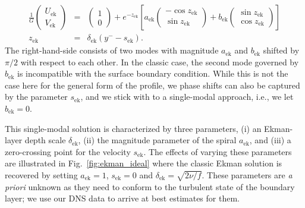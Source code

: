 \documentclass[a4paper,11pt]{amsart}
\begin{document}
\begin{subequations}
  \label{eqn:profile_ekman}
  \begin{eqnarray}
    \frac{1}{G}\left(\begin{array}{c} 
      U_\mathrm{ek}\\ 
      V_\mathrm{ek}
    \end{array}\right)  &=& \left(\begin{array}{c} 1 \\ 0 \end{array}\right) 
    + e^{-z_\mathrm{ek}} \left[ a_\mathrm{ek}  \left(\begin{array}{r}
      -\cos z_\mathrm{ek} \\ 
      \sin z_\mathrm{ek}
      \end{array}\right)  + b_\mathrm{ek}\left(\begin{array}{r}
        \sin z_\mathrm{ek} \\ \cos z_\mathrm{ek}
        \end{array}\right)\right]\\
    z_\mathrm{ek} &=& \delta_\mathrm{ek} (y^- -s_\mathrm{ek}). 
  \end{eqnarray}
\end{subequations}
%
The right-hand-side consists of two modes with magnitude $a_\mathrm{ek}$ and $b_\mathrm{ek}$
shifted by $\pi/2$ with respect to each other. 
%
In the classic case, the second mode governed by $b_\mathrm{ek}$ is incompatible with
the surface boundary condition. 
%
While this is not the case here for the general form of the profile, we
phase shifts can also be captured by the parameter $s_\mathrm{ek}$, 
and we stick with to a single-modal approach, i.e., we let $b_\mathrm{ek}=0$. 
%
\par 
%
This single-modal solution is characterized by three parameters,
(i) an Ekman-layer depth scale $\delta_\mathrm{ek}$,
(ii) the magnitude parameter of the spiral $a_\mathrm{ek}$, and
(iii) a zero-crossing point for the velocity $s_\mathrm{ek}$.
%
The effects of varying these parameters are illustrated in Fig.~\ref{fig:ekman_ideal} where
the classic Ekman solution is recovered by setting $a_\mathrm{ek}=1$, $s_\mathrm{ek}=0$ and
$\delta_\mathrm{ek}=\sqrt{2\nu/f}$.
% 
These parameters are \emph{a priori} unknown as they need to conform to the turbulent state of the
boundary layer; we use our DNS data to arrive at best estimates for them.
%
\par
%
\end{document}
